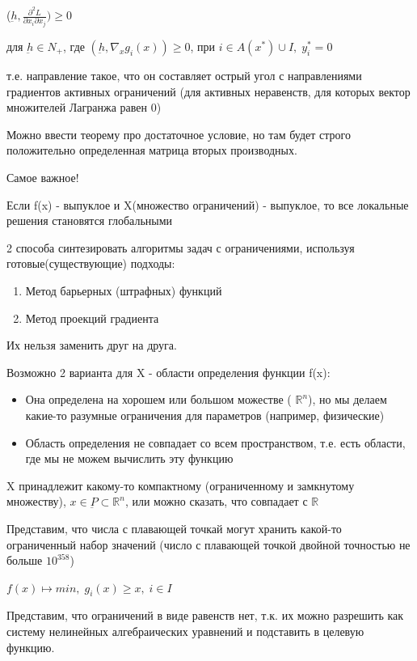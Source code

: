 \documentclass[a4paper, 12pt]{article}
\begin{document}
	($\underbar{h}, \frac{\partial^2 L}{\partial x_i \partial x_j}) \geq 0$
	
	для $\underbar{h} \in N_+$, где $(\underbar{h}, \nabla_x g_i(x)) \geq 0$, при $i \in A(x^*) \cup I, \; y^*_i =0$
	
	т.е. направление  такое, что он составляет острый угол с направлениями градиентов активных ограничений (для активных неравенств, для которых вектор множителей Лагранжа равен 0)
	
	Можно ввести теорему про достаточное условие, но там будет строго положительно определенная матрица вторых производных.
	
	Самое важное!
	
	Если f(x) - выпуклое и X(множество ограничений) - выпуклое, то все локальные решения становятся глобальными
	
	2 способа синтезировать алгоритмы задач с ограничениями, используя готовые(существующие) подходы:
	
	\begin{enumerate}
		\item Метод барьерных (штрафных) функций 
		\item Метод проекций градиента
	\end{enumerate}
	
	Их нельзя заменить друг на друга.
	
	Возможно 2 варианта для X - области определения функции f(x):
	
	\begin{itemize}
		\item Она определена на хорошем или большом можестве ( $\mathbb {R}^n$), но мы делаем какие-то разумные ограничения для параметров (например, физические)
		\item Область определения не совпадает со всем пространством, т.е. есть области, где мы не можем вычислить эту функцию
	\end{itemize}
	
	X принадлежит какому-то компактному (ограниченному и замкнутому множеству), $x \in \underbar{P} \subset 
	\mathbb {R}^n$, или можно сказать, что совпадает с $\mathbb {R}$
	
	Представим, что числа с плавающей точкай могут хранить какой-то ограниченный набор значений (число с плавающей точкой двойной точностью не больше $10^{358}$)
	
	$f(x) \mapsto min, \; g_i(x) \geq x, \; i \in I$
	
	Представим, что ограничений в виде равенств нет, т.к. их можно разрешить как систему нелинейных алгебраических уравнений и подставить в целевую функцию. 
	
\end{document}
